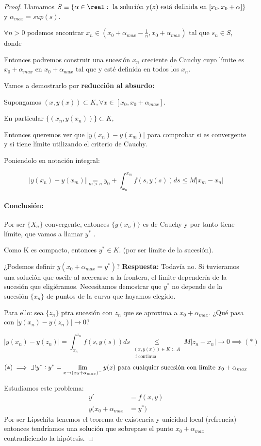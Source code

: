 \begin{proof}
Llamamos $S\equiv \{\alpha\in\real \st \text{ la solución y(x) está definida en } [x_0,x_0+\alpha] \}$ y $\alpha_{max} = sup(s)$.

$\forall n>0$ podemos encontrar $x_n \in \left(x_0 + \alpha_{max} - \frac{1}{n},x_0+\alpha_{max}\right)$ tal que $s_n\in S$, donde 

Entonces podremos construir una sucesión $x_n$ creciente de Cauchy cuyo límite es $x_0+\alpha_{max}$ en $x_0 + \alpha_{max}$ tal que y esté definida en todos los $x_n$.

Vamos a demostrarlo por \textbf{reducción al absurdo:}

Supongamos $(x,y(x))\subset K, \forall x\in[x_0,x_0+\alpha_{max}]$.

En particular $\{(x_n,y(x_n))\}\subset K$,


Entonces queremos ver que $| y(x_n) - y(x_m)|$ para comprobar si es convergente y si tiene límite utilizando el criterio de Cauchy.

Poniendolo en notación integral:

\[| y(x_n) - y(x_m)| \underset{m>n}{=} y_0 + \int_{x_n}^{x_m} f(s,y(s))ds \leq M |x_m-x_n| \]

\paragraph{Conclusión:}
Por ser $\{X_n\}$ convergente, entonces $\{y(x_n)\}$ es de Cauchy y por tanto tiene límite, que vamos a llamar $y^{\ast}$ .

Como K es compacto, entonces $y^{\ast}\in K$. (por ser límite de la sucesión).

¿Podemos definir $y(x_0+\alpha_{max} = y^{\ast})$? 
\textbf{Respuesta:} Todavía no. Si tuvieramos una solución que oscile al acercarse a la frontera, el límite dependería de la sucesión que eligiéramos. Necesitamos demostrar que $y^{\ast}$ no depende de la sucesión $\{x_n\}$ de puntos de la curva que hayamos elegido.

Para ello: sea $\{z_n\}$ ptra sucesión con $z_n$ que se aproxima a $x_0+\alpha_{max}$. ¿Qué pasa con $|y(x_n) - y(z_n)| \to 0$? 


\[|y(x_n) - y(z_n)| = \int_{x_n}^{z_n} f(s,y(s))ds \underset{\begin{array}{c}(x,y(x))\in K \subset A\\\text{ f continua }\end{array}}{\leq}M |z_n - x_n| \to 0 \implies (*) \]
\[(*) \implies \exists!y^{\ast} : y^{\ast} = \lim_{x\to (x_0+\alpha_{max})^{-}} y(x) \text{ para cualquier sucesión con límite } x_0+\alpha_{max}\]


Estudiamos este problema:
\[\begin{array}{cc}
y' &= f(x,y)\\
y(x_0+\alpha_{max} &= y^{\ast})
\end{array}\]
Por ser Lipschitz tenemos el teorema de existencia y unicidad local (refrencia) entonces tendríamos una solución que sobrepase el punto $x_0+\alpha_{max}$ contradiciendo la hipótesis.

\end{proof}

